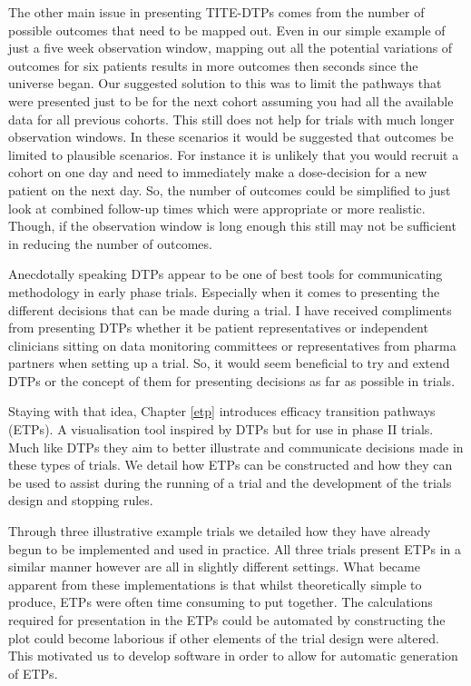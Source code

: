 The other main issue in presenting TITE-DTPs comes from the number of possible outcomes that need to be mapped out. Even in our simple example of just a five week observation window, mapping out all the potential variations of outcomes for six patients results in more outcomes then seconds since the universe began.  Our suggested solution to this was to limit the pathways that were presented just to be for the next cohort assuming you had all the available data for all previous cohorts. This still does not help for trials with much longer observation windows. In these scenarios it would be suggested that outcomes be limited to plausible scenarios. For instance it is unlikely that you would recruit a cohort on one day and need to immediately make a dose-decision for a new patient on the next day. So, the number of outcomes could be simplified to just look at combined follow-up times which were appropriate or more realistic. Though, if the observation window is long enough this still may not be sufficient in reducing the number of outcomes. 

Anecdotally speaking DTPs appear to be one of best tools for communicating methodology in early phase trials. Especially when it comes to presenting the different decisions that can be made during a trial. I have received compliments from presenting DTPs whether it be patient representatives or independent clinicians sitting on data monitoring committees or representatives from pharma partners when setting up a trial. So, it would seem beneficial to try and extend DTPs or the concept of them for presenting decisions as far as possible in trials.  

Staying with that idea, Chapter \ref{etp} introduces efficacy transition pathways (ETPs). A visualisation tool inspired by DTPs but for use in phase \RN{2} trials. Much like DTPs they aim to better illustrate and communicate decisions made in these types of trials. We detail how ETPs can be constructed and how they can be used to assist during the running of a trial and the development of the trials design and stopping rules. 

Through three illustrative example trials we detailed how they have already begun to be implemented and used in practice. All three trials present ETPs in a similar manner however are all in slightly different settings. What became apparent from these implementations is that whilst theoretically simple to produce, ETPs were often time consuming to put together. The calculations required for presentation in the ETPs could be automated by constructing the plot could become laborious if other elements of the trial design were altered. This motivated us to develop software in order to allow for automatic generation of ETPs.      

